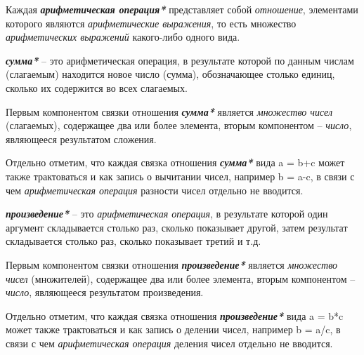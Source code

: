 Каждая \textbf{\textit{арифметическая операция*}} представляет собой \textit{отношение}, элементами которого являются \textit{арифметические выражения}, то есть множество \textit{арифметических выражений} какого-либо одного вида.
	
\begin{SCn}
\end{SCn}

\textbf{\textit{сумма*}} -- это арифметическая операция, в результате которой по данным числам (слагаемым) находится новое число (сумма), обозначающее столько единиц, сколько их содержится во всех слагаемых.
		
Первым компонентом связки отношения \textbf{\textit{сумма*}} является \textit{множество чисел} (слагаемых), содержащее два или более элемента, вторым компонентом -- \textit{число}, являющееся результатом сложения.
		
Отдельно отметим, что каждая связка отношения \textbf{\textit{сумма*}} вида a = b+c может также трактоваться и как запись о вычитании чисел, например b = a-c, в связи с чем \textit{арифметическая операция} разности чисел отдельно не вводится.

\begin{SCn}
\end{SCn}

\textbf{\textit{произведение*}} -- это \textit{арифметическая операция}, в результате которой один аргумент складывается столько раз, сколько показывает другой, затем результат складывается столько раз, сколько показывает третий и т.д.
		
Первым компонентом связки отношения \textbf{\textit{произведение*}} является \textit{множество чисел} (множителей), содержащее два или более элемента, вторым компонентом -- \textit{число}, являющееся результатом произведения.
		
Отдельно отметим, что каждая связка отношения \textbf{\textit{произведение*}} вида a = b*c может также трактоваться и как запись о делении чисел, например b = a/c, в связи с чем \textit{арифметическая операция} деления чисел отдельно не вводится.

\begin{SCn}
\end{SCn}

